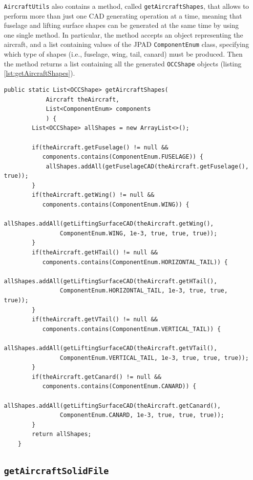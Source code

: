 \bigskip
\noindent
\lstinline[language=Java]!AircraftUtils! also contains a method, called \lstinline[language=Java]!getAircraftShapes!, that allows to perform more than just one 
\gls{CAD} generating operation at a time, meaning that fuselage and lifting surface shapes can be generated at the same time by using one single method. In particular, the method accepts an object representing the aircraft, and a list containing values of the \gls{JPAD} \lstinline[language=Java]!ComponentEnum! class, specifying which type of shapes (i.e., fuselage, wing, tail, canard) must be produced. Then the method returns a list containing all the generated \lstinline[language=Java]!OCCShape! objects (listing \ref{lst:getAircraftShapes}).
\bigskip
\begin{lstlisting}[caption={\lstinline!getAircraftShapes! method}, captionpos=b, tabsize=2, label={lst:getAircraftShapes}]
public static List<OCCShape> getAircraftShapes(
			Aircraft theAircraft,
			List<ComponentEnum> components
			) {		
		List<OCCShape> allShapes = new ArrayList<>();
		
		if(theAircraft.getFuselage() != null && 
		   components.contains(ComponentEnum.FUSELAGE)) {
			allShapes.addAll(getFuselageCAD(theAircraft.getFuselage(), true));
		}		
		if(theAircraft.getWing() != null && 
		   components.contains(ComponentEnum.WING)) {
			allShapes.addAll(getLiftingSurfaceCAD(theAircraft.getWing(), 
				ComponentEnum.WING, 1e-3, true, true, true));
		}		
		if(theAircraft.getHTail() != null && 
		   components.contains(ComponentEnum.HORIZONTAL_TAIL)) {		
			allShapes.addAll(getLiftingSurfaceCAD(theAircraft.getHTail(), 
				ComponentEnum.HORIZONTAL_TAIL, 1e-3, true, true, true));
		}		
		if(theAircraft.getVTail() != null && 
		   components.contains(ComponentEnum.VERTICAL_TAIL)) {		
			allShapes.addAll(getLiftingSurfaceCAD(theAircraft.getVTail(), 
				ComponentEnum.VERTICAL_TAIL, 1e-3, true, true, true));
		}			
		if(theAircraft.getCanard() != null && 
		   components.contains(ComponentEnum.CANARD)) {		
			allShapes.addAll(getLiftingSurfaceCAD(theAircraft.getCanard(), 
				ComponentEnum.CANARD, 1e-3, true, true, true));
		}			
		return allShapes;
	}
\end{lstlisting}

\subsection{\texttt{getAircraftSolidFile}}
\label{sec3.5.4}

